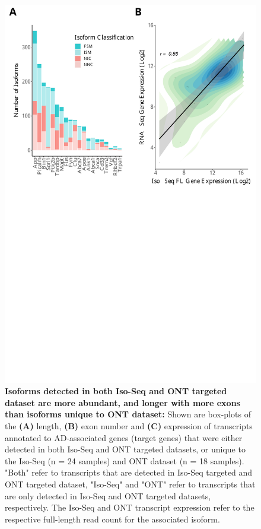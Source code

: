 \begin{figure}[!htp]
	\begin{center}
		\includegraphics[page=4,trim={0 13cm 0 0cm},clip,scale = 0.60]{Figures/ONTvsIsoSeq.pdf}
	\end{center}
	\captionsetup{width=0.95\textwidth}
	\caption[Comparison of the length, expression and exon number of common vs unique isoforms detected from targeted transcriptome profiling]%
	{\textbf{Isoforms detected in both Iso-Seq and ONT targeted dataset are more abundant, and longer with more exons than isoforms unique to ONT dataset:} Shown are box-plots of the \textbf{(A)} length, \textbf{(B)} exon number and \textbf{(C)} expression of transcripts annotated to AD-associated genes (target genes) that were either detected in both Iso-Seq and ONT targeted datasets, or unique to the Iso-Seq (n = 24 samples) and ONT dataset (n = 18 samples). "Both" refer to transcripts that are detected in Iso-Seq targeted and ONT targeted dataset, "Iso-Seq" and "ONT" refer to transcripts that are only detected in Iso-Seq and ONT targeted datasets, respectively. The Iso-Seq and ONT transcript expression refer to the respective full-length read count for the associated isoform.}
	\label{fig:ontvsisoseq_description}
\end{figure}

